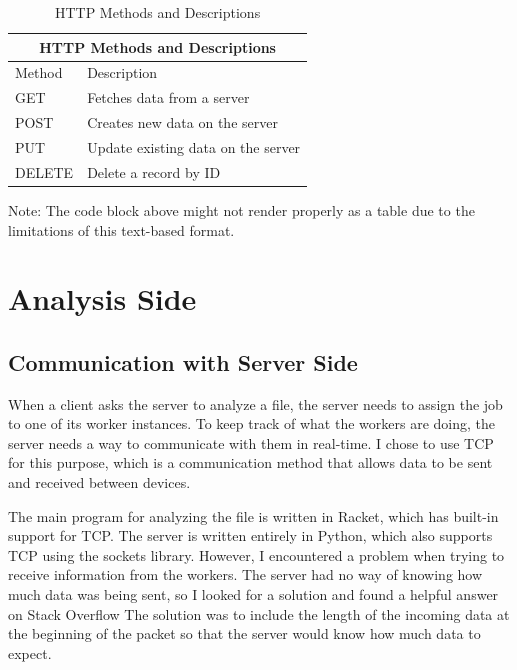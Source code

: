 \begin{table}
    \centering
    \begin{tabular}{|p{2cm}|p{6cm}|}
        \hline
        \multicolumn{2}{|c|}{HTTP Methods and Descriptions} \\
        \hline
        Method & Description\\
        \hline
        GET & Fetches data from a server\\
        \hline
        POST & Creates new data on the server\\
        \hline
        PUT & Update existing data on the server\\
        \hline
        DELETE & Delete a record by ID\\
        \hline
    \end{tabular}
    \caption{HTTP Methods and Descriptions}
    \label{table:httpmethods}
\end{table}

Note: The code block above might not render properly as a table due to the limitations of this text-based format.

\section{Analysis Side}

\subsection{Communication with Server Side}
When a client asks the server to analyze a file,
the server needs to assign the job to one of its worker instances.
To keep track of what the workers are doing, the server needs a way to communicate with them in real-time.
I chose to use TCP for this purpose, which is a communication method that allows data to be sent and received between devices.

The main program for analyzing the file is written in Racket,
which has built-in support for TCP. The server is written entirely in Python,
which also supports TCP using the sockets library.
However, I encountered a problem when trying to receive information from the workers.
The server had no way of knowing how much data was being sent,
so I looked for a solution and found a helpful answer on Stack Overflow \cite{chqrlie:2022}
The solution was to include the length of the incoming data at the beginning of the packet
so that the server would know how much data to expect.
